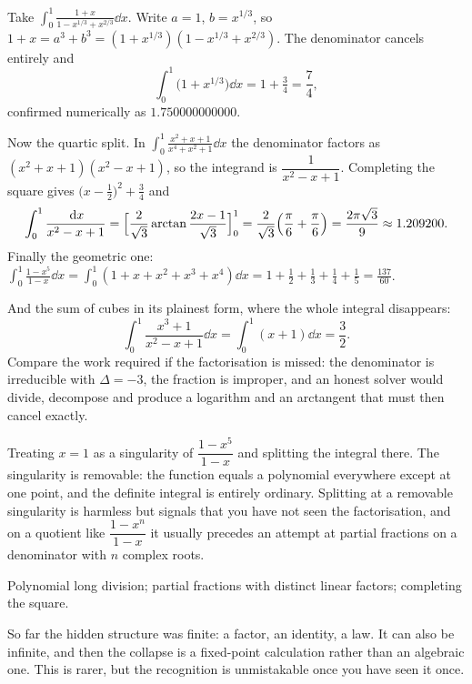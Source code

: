 \begin{worked}
Take $\displaystyle\int_0^1\frac{1+x}{1-x^{1/3}+x^{2/3}}\dd x$. Write $a=1$, $b=x^{1/3}$, so $1+x=a^3+b^3=(1+x^{1/3})(1-x^{1/3}+x^{2/3})$. The denominator cancels entirely and
\[
\int_0^1\bigl(1+x^{1/3}\bigr)\dd x=1+\tfrac34=\frac74 ,
\]
confirmed numerically as $1.750000000000$.

Now the quartic split. In $\displaystyle\int_0^1\frac{x^2+x+1}{x^4+x^2+1}\dd x$ the denominator factors as $(x^2+x+1)(x^2-x+1)$, so the integrand is $\dfrac{1}{x^2-x+1}$. Completing the square gives $\bigl(x-\tfrac12\bigr)^2+\tfrac34$ and
\[
\int_0^1\frac{\,\mathrm{d} x}{x^2-x+1}=\Bigl[\frac{2}{\sqrt3}\arctan\frac{2x-1}{\sqrt3}\Bigr]_0^1=\frac{2}{\sqrt3}\Bigl(\frac{\pi}{6}+\frac{\pi}{6}\Bigr)=\frac{2\pi\sqrt3}{9}\approx1.209200 .
\]
Finally the geometric one: $\displaystyle\int_0^1\frac{1-x^5}{1-x}\dd x=\int_0^1(1+x+x^2+x^3+x^4)\dd x=1+\tfrac12+\tfrac13+\tfrac14+\tfrac15=\frac{137}{60}$.

And the sum of cubes in its plainest form, where the whole integral disappears:
\[
\int_0^1\frac{x^3+1}{x^2-x+1}\dd x=\int_0^1(x+1)\dd x=\frac32 .
\]
Compare the work required if the factorisation is missed: the denominator is irreducible with $\Delta=-3$, the fraction is improper, and an honest solver would divide, decompose and produce a logarithm and an arctangent that must then cancel exactly.
\end{worked}

\begin{trap}
Treating $x=1$ as a singularity of $\dfrac{1-x^5}{1-x}$ and splitting the integral there. The singularity is removable: the function equals a polynomial everywhere except at one point, and the definite integral is entirely ordinary. Splitting at a removable singularity is harmless but signals that you have not seen the factorisation, and on a quotient like $\dfrac{1-x^n}{1-x}$ it usually precedes an attempt at partial fractions on a denominator with $n$ complex roots.
\end{trap}

\begin{seealsob}Polynomial long division; partial fractions with distinct linear factors; completing the square.\end{seealsob}

So far the hidden structure was finite: a factor, an identity, a law. It can also be infinite, and then the collapse is a fixed-point calculation rather than an algebraic one. This is rarer, but the recognition is unmistakable once you have seen it once.

